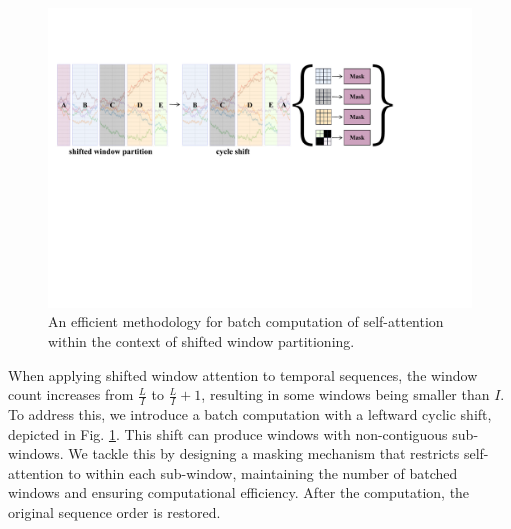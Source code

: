 \documentclass[letterpaper]{article} %
\begin{document}
\begin{figure}[h]
\renewcommand{\baselinestretch}{1.0}
\centering 
\includegraphics[width=0.92\columnwidth]{shift.pdf}
\caption{An efficient methodology for batch computation of self-attention within the context of shifted window partitioning.}\label{fig4}
\end{figure}
When applying shifted window attention to temporal sequences, the window count increases from $\frac{L}{I}$ to $\frac{L}{I} + 1$, resulting in some windows being smaller than $I$. To address this, we introduce a batch computation with a leftward cyclic shift, depicted in Fig. \ref{fig4}. This shift can produce windows with non-contiguous sub-windows. We tackle this by designing a masking mechanism that restricts self-attention to within each sub-window, maintaining the number of batched windows and ensuring computational efficiency. After the computation, the original sequence order is restored.
\end{document}
